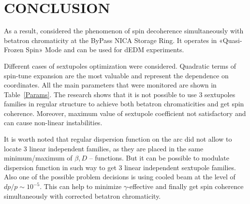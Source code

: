 \documentclass[a4paper,
               keeplastbox,   %
               ]{jacow}
\begin{document}
\section{CONCLUSION}
\par As a result, considered the phenomenon of spin decoherence simultaneously with betatron chromaticity at the ByPass NICA Storage Ring. It operates in «Quasi-Frozen Spin» Mode and can be used for dEDM experiments. 
\par Different cases of sextupoles optimization were considered. Quadratic terms of spin-tune expansion are the most valuable and represent the dependence on coordinates. All the main parameters that were monitored are shown in Table~\ref{Params}.
The research shows that it is not possible to use 3 sextupoles families in regular structure to achieve both betatron chromaticities and get spin coherence. Moreover, maximum value of sextupole coefficient not satisfactory and can cause non-linear instabilities.

\par It is worth noted that regular dispersion function on the arc did not allow to locate 3 linear independent families, as they are placed in the same minimum/maximum of $\beta, D$ – functions.
But it can be possible to modulate dispersion function in such way to get 3 linear independent sextupole families.
Also one of the possible problem decisions is using cooled beam at the level of ${dp}/{p}\sim10^{-5}$. This can help to minimize $\gamma$-effective and finally get spin coherence simultaneously with corrected betatron chromaticity.
\end{document}
